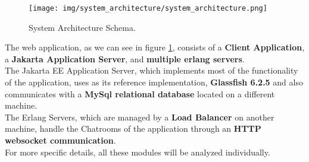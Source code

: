 \begin{figure}[H]
    \centering
     \texttt{[image: img/system\_architecture/system\_architecture.png]}
    \caption{\label{fig:system_architecture} System Architecture Schema.}
\end{figure}

The web application, as we can see in figure \ref{fig:system_architecture}, consists of a \textbf{Client Application}, a \textbf{Jakarta Application Server}, and \textbf{multiple erlang servers}.\\
The Jakarta EE Application Server, which implements most of the functionality of the application, uses as its reference implementation, \textbf{Glassfish 6.2.5} and also communicates with a \textbf{MySql relational database} located on a different machine.\\
The Erlang Servers, which are managed by a \textbf{Load Balancer} on another machine, handle the Chatrooms of the application through an \textbf{HTTP websocket communication}.\\
For more specific details, all these modules will be analyzed individually.
\newpage